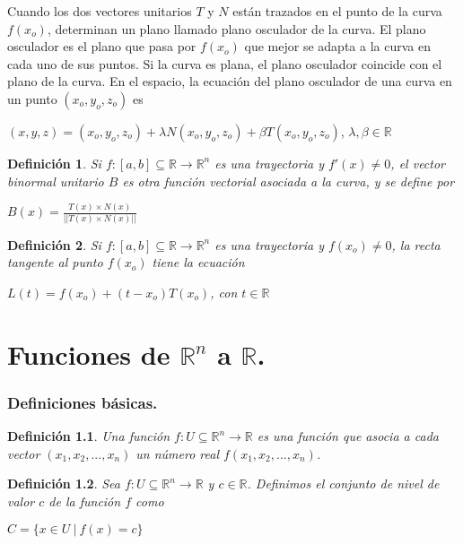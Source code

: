 \documentclass{book}
\newtheorem{definition}{Definición}[section]
\begin{document}
Cuando los dos vectores unitarios $T$ y $N$ están trazados en el punto de la curva $f(x_o)$, determinan un plano llamado plano osculador de la curva. El plano osculador es el plano que pasa por $f(x_o)$ que mejor se adapta a la curva en cada uno de sus puntos. Si la curva es plana, el plano osculador coincide con el plano de la curva. En el espacio, la ecuación del plano osculador de una curva en un punto $(x_o,y_o,z_o)$ es
\begin{center}
    $(x,y,z)=(x_o,y_o,z_o)+\lambda N(x_o,y_o,z_o)+\beta T(x_o,y_o,z_o)$, $\lambda, \beta \in \mathbb{R}$
\end{center}
\begin{definition}
Si $f:[a,b]\subseteq \mathbb{R} \rightarrow \mathbb{R}^n$ es una trayectoria y $f'(x)\neq 0$, el vector binormal unitario $B$ es otra función vectorial asociada a la curva, y se define por
\begin{center}
    $B(x)=\frac{T(x)\times N(x)}{||T(x)\times N(x)||}$
\end{center}
\end{definition}
\begin{definition}
Si $f:[a,b]\subseteq \mathbb{R} \rightarrow \mathbb{R}^n$ es una trayectoria y $f(x_o)\neq 0$, la recta tangente al punto $f(x_o)$ tiene la ecuación
\begin{center}
    $L(t)=f(x_o)+(t-x_o)T(x_o)$, con $t\in \mathbb{R}$
\end{center}

\end{definition}
\chapter{Funciones de $\mathbb{R}^n$ a $\mathbb{R}$.}
\subsection{Definiciones básicas.}
\begin{definition}
Una función $f:U\subseteq \mathbb{R}^n \rightarrow \mathbb{R}$ es una función que asocia a cada vector $(x_1,x_2,...,x_n)$ un número real $f(x_1,x_2,...,x_n)$.
\end{definition}
\begin{definition}
Sea $f:U\subseteq \mathbb{R}^n \rightarrow \mathbb{R}$
 y $c\in \mathbb{R}$. Definimos el conjunto de nivel de valor $c$ de la función $f$ como
\begin{center}
    $C=\{x\in U \ | \ f(x)=c\}$
\end{center}
\end{definition}
\end{document}

